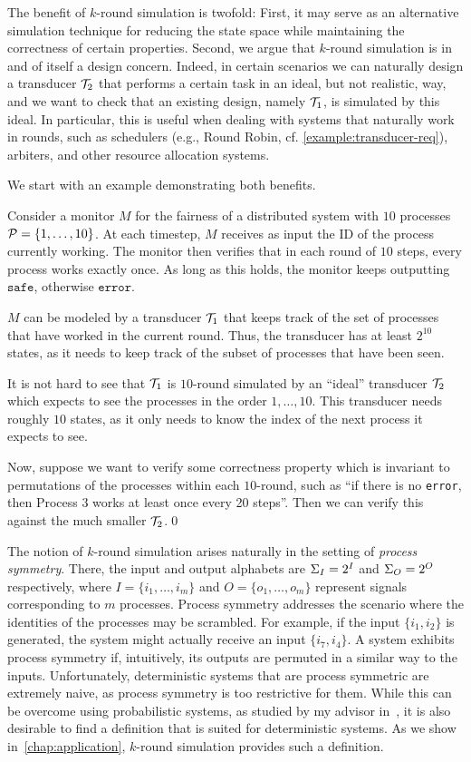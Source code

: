 The benefit of $k$-round simulation is twofold: First, it may serve as an alternative simulation technique for reducing the state space while maintaining the correctness of certain properties. Second, we argue that $k$-round simulation is in and of itself a design concern. Indeed, in certain scenarios we can naturally design a transducer $\mathcal{T}_2$ that performs a certain task in an ideal, but not realistic, way, and we want to check that an existing design, namely $\mathcal{T}_1$, is simulated by this ideal. In particular, this is useful when dealing with systems that naturally work in rounds, such as schedulers (e.g., Round Robin, cf. \autoref{example:transducer-req}), arbiters, and other resource allocation systems.

We start with an example demonstrating both benefits.
\begin{example}
\label{example:MC_rounds}
Consider a monitor $M$ for the fairness of a distributed system with $10$ processes $\mathcal{P}=\{1,\ldots,10\}$. At each timestep, $M$ receives as input the ID of the process currently working. The monitor then verifies that in each round of $10$ steps, every process works exactly once. As long as this holds, the monitor keeps outputting $\texttt{safe}$, otherwise $\texttt{error}$.

$M$ can be modeled by a transducer $\mathcal{T}_1$ that keeps track of the set of processes that have worked in the current round. Thus, the transducer has at least $2^{10}$ states, as it needs to keep track of the subset of processes that have been seen.

It is not hard to see that $\mathcal{T}_1$ is $10$-round simulated by an ``ideal'' transducer $\mathcal{T}_2$ which expects to see the processes in the order $1,\ldots,10$. This transducer needs roughly $10$ states, as it only needs to know the index of the next process it expects to see.

Now, suppose we want to verify some correctness property which is invariant to permutations of the processes within each $10$-round, such as ``if there is no \texttt{error}, then Process $3$ works at least once every 20 steps''. Then we can verify this against the much smaller $\mathcal{T}_2$.\qed
\end{example}

The notion of $k$-round simulation arises naturally in the setting of \emph{process symmetry}. There, the input and output alphabets are $\Sigma_{I}=2^{I}$ and $\Sigma_{O}=2^{O}$ respectively, where $I=\{i_1,\ldots,i_m\}$ and $O=\{o_1,\ldots,o_m\}$ represent signals corresponding to $m$ processes. Process symmetry addresses the scenario where the identities of the processes may be scrambled. For example, if the input $\{i_1,i_2\}$ is generated, the system might actually receive an input $\{i_7,i_4\}$. A system exhibits process symmetry if, intuitively, its outputs are permuted in a similar way to the inputs. Unfortunately, deterministic systems that are process symmetric are extremely naive, as process symmetry is too restrictive for them. While this can be overcome using probabilistic systems, as studied by my advisor in~\cite{Almagor2020b}, it is also desirable to find a definition that is suited for deterministic systems. As we show in~\autoref{chap:application}, $k$-round simulation provides such a definition.

